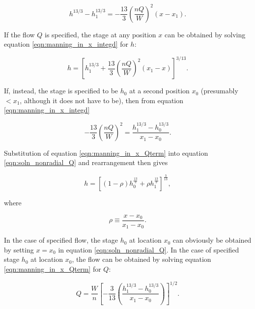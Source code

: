 \documentclass[fleqn]{article}
\begin{document}
\begin{equation}
   h^{13/3} - h_1^{13/3} = -\frac{13}{3} \left ( \frac{n Q}{W} \right )^{2} \left (x - x_{1} \right ).
  \label{eqn:manning_in_x_integd}
\end{equation}

If the flow $Q$ is specified, the stage at any position $x$ can be obtained by solving equation \ref{eqn:manning_in_x_integd} for $h$:

\begin{equation}
   h = \left [ h_{1}^{13/3}  + \frac{13}{3} \left ( \frac{n Q}{W} \right )^{2} \left (x_{1} - x \right ) \right ]^{3/13}.
  \label{eqn:soln_nonradial_Q}
\end{equation}

If, instead, the stage is specified to be $h_{0}$ at a second position $x_{0}$ (presumably $< x_{1}$, although it does not have to be), then from equation \ref{eqn:manning_in_x_integd}

\begin{equation}
  -\frac{13}{3} \left ( \frac{n Q}{W} \right )^{2} = \frac{ h_{1}^{13/3} - h_{0}^{13/3}}{x_{1} - x_{0}}.
  \label{eqn:manning_in_x_Qterm}
\end{equation}

\noindent Substitution of equation \ref{eqn:manning_in_x_Qterm} into equation \ref{eqn:soln_nonradial_Q} and rearrangement then gives

\begin{equation}
  h = \left [ \left (1 - \rho \right ) h^{\frac{13}{3}}_{0} + \rho h^{\frac{13}{3}}_{1} \right ]^{\frac{3}{13}} ,
  \label{eqn:soln_nonradial_h0}
\end{equation}

\noindent where 

\begin{equation}
  \rho \equiv \frac{x - x_{0}}{x_{1} - x_{0}} .
  \label{eqn:rho_in_x}
\end{equation}

In the case of specified flow, the stage $h_0$ at location $x_{0}$ can obviously be obtained by setting $x = x_{0}$ in equation \ref{eqn:soln_nonradial_Q}. In the case of specified stage $h_{0}$ at location $x_{0}$, the flow can be obtained by solving equation \ref{eqn:manning_in_x_Qterm} for $Q$:

\begin{equation}
  Q = \frac{W}{n} \left [ -\frac{3}{13} \left ( \frac{ h_{1}^{13/3} - h_{0}^{13/3}}{x_{1} - x_{0}} \right ) \right ]^{1/2}.
  \label{eqn:manning_in_x_Q}
\end{equation}
\end{document}
